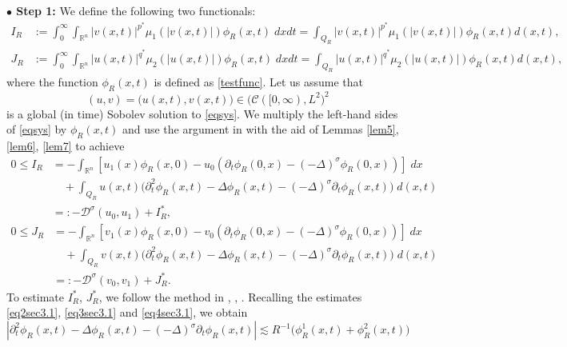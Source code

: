 \documentclass[11pt,reqno]{amsart}
\numberwithin{equation}{section}
\theoremstyle{plain}
\begin{document}
\noindent\textbf{$\bullet$ Step 1:} We define the following two functionals:
\[
\begin{aligned}
I_{R}&:=\int_{0}^{\infty}\int_{\mathbb{R}^n}|v(x,t)|^{p^*}\mu_1(|v(x,t)|)\phi_{R}(x,t)\;dxdt=\int_{Q_{R}}|v(x,t)|^{p^*}\mu_1(|v(x,t)|)\phi_{R}(x,t)d(x,t),\\    J_{R}&:=\int_{0}^{\infty}\int_{\mathbb{R}^n}|u(x,t)|^{q^*}\mu_2(|u(x,t)|)\phi_{R}(x,t)\;dxdt=\int_{Q_{R}}|u(x,t)|^{q^*}\mu_2(|u(x,t)|)\phi_{R}(x,t)d(x,t),   
\end{aligned}
\]
where the function $\phi_{R}(x,t)$ is defined as \eqref{testfunc}. Let us assume that
$$ (u,v)=\big(u(x,t),v(x,t)\big)\in \big(\mathcal{C}([0,\infty),L^2\big)^2 $$
is a global (in time) Sobolev solution to \eqref{eqsys}. We multiply the left-hand sides of \eqref{eqsys} by $\phi_R(x,t)$ and use the argument in \cite{Anhblowup} with the aid of Lemmas \ref{lem5}, \ref{lem6}, \ref{lem7} to achieve
\begin{equation}\label{esIR}
\begin{aligned}
0\leq I_{R}&=-\int_{\mathbb{R}^n}\left[u_1(x)\phi_R(x,0)-u_0\left(\partial_t\phi_R(0,x)-(-\Delta)^{\sigma}\phi_R(0,x)\right)\right]\;dx\\
&\quad +\int_{Q_{R}}u(x,t)\big(\partial^2_t \phi_{R}(x,t)-\Delta\phi_{R}(x,t)-(-\Delta)^{\sigma}\partial_t  \phi_{R}(x,t)\big)\;d(x,t)\\
&=:-\mathcal{D}^{\sigma}(u_0,u_1)+I^*_{R},
\end{aligned}
\end{equation}
\begin{equation}\label{esJR}
\begin{aligned}
0\leq J_{R}&=-\int_{\mathbb{R}^n}\left[v_1(x)\phi_R(x,0)-v_0\left(\partial_t\phi_R(0,x)-(-\Delta)^{\sigma}\phi_R(0,x)\right)\right]\;dx\\
&\quad +\int_{Q_{R}}v(x,t)\big(\partial^2_t \phi_{R}(x,t)-\Delta\phi_{R}(x,t)-(-\Delta)^{\sigma}\partial_t\phi_{R}(x,t)\big)\;d(x,t)\\
&=:-\mathcal{D}^{\sigma}(v_0,v_1)+J^*_{R}.
\end{aligned}
\end{equation}
To estimate $I_{R}^*$, $J_{R}^*$, we follow the method in \cite{EbeGirRei2020}, \cite{AnhRei2021}, \cite{AnhRei2019}. Recalling the estimates \eqref{eq2sec3.1}, \eqref{eq3sec3.1} and \eqref{eq4sec3.1}, we obtain
\begin{equation}\label{eq1sec3.2}
    |\partial^2_t  \phi_{R}(x,t)-\Delta\phi_{R}(x,t)-(-\Delta)^{\sigma}\partial_t  \phi_R(x,t)|\lesssim R^{-1}\big(\phi^1_{R}(x,t)+\phi^2_R(x,t)\big)
\end{equation}
\end{document}
